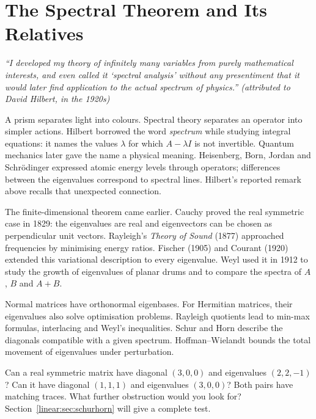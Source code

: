 \chapter{The Spectral Theorem and Its Relatives}\label{linear:ch:spectral}

\begin{center}\itshape
``I developed my theory of infinitely many variables from purely mathematical interests, and even called it `spectral analysis' without any presentiment that it would later find application to the actual spectrum of physics.''
\upshape(attributed to David Hilbert, in the 1920s)
\end{center}

A prism separates light into colours. Spectral theory separates an operator into simpler actions. Hilbert borrowed the word \emph{spectrum} while studying integral equations: it names the values $\lambda$ for which $A-\lambda I$ is not invertible. Quantum mechanics later gave the name a physical meaning. Heisenberg, Born, Jordan and Schr\"odinger expressed atomic energy levels through operators; differences between the eigenvalues correspond to spectral lines. Hilbert's reported remark above recalls that unexpected connection.

The finite-dimensional theorem came earlier. Cauchy proved the real symmetric case in 1829: the eigenvalues are real and eigenvectors can be chosen as perpendicular unit vectors. Rayleigh's \emph{Theory of Sound} (1877) approached frequencies by minimising energy ratios. Fischer (1905) and Courant (1920) extended this variational description to every eigenvalue. Weyl used it in 1912 to study the growth of eigenvalues of planar drums and to compare the spectra of $A$, $B$ and $A+B$.


Normal matrices have orthonormal eigenbases. For Hermitian matrices, their eigenvalues also solve optimisation problems. Rayleigh quotients lead to min-max formulas, interlacing and Weyl's inequalities. Schur and Horn describe the diagonals compatible with a given spectrum. Hoffman--Wielandt bounds the total movement of eigenvalues under perturbation.

\begin{think}
Can a real symmetric matrix have diagonal $(3,0,0)$ and eigenvalues $(2,2,-1)$? Can it have diagonal $(1,1,1)$ and eigenvalues $(3,0,0)$? Both pairs have matching traces. What further obstruction would you look for? Section~\ref{linear:sec:schurhorn} will give a complete test.
\end{think}

